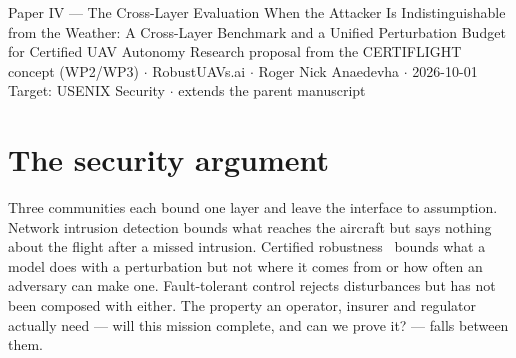 \documentclass[11pt,a4paper]{article}
\newcommand{\dnet}{\delta_{\mathrm{net}}}
\newcommand{\dfault}{\delta_{\mathrm{fault}}}
\newcommand{\denv}{\delta_{\mathrm{env}}}
\newcommand{\dgnss}{\delta_{\mathrm{gnss}}}
\newcommand{\dtot}{\delta_{\mathrm{tot}}}
\begin{document}
\proposalheader
  {Paper IV --- The Cross-Layer Evaluation}
  {When the Attacker Is Indistinguishable from the Weather: A Cross-Layer
   Benchmark and a Unified Perturbation Budget for Certified UAV Autonomy}
  {Research proposal from the CERTIFLIGHT concept (WP2/WP3) $\cdot$ RobustUAVs.ai
   $\cdot$ Roger Nick Anaedevha $\cdot$ 2026-10-01\\
   Target: USENIX Security $\cdot$ extends the parent manuscript~\cite{parentpaper}}

\begin{abstract}
\noindent
A UAV's navigation stack cannot tell, from the signal alone, whether its position
error is caused by a jammer, a drifting inertial unit, or a gust. We take that
indistinguishability as a security principle rather than a nuisance. If a
certificate is to mean anything to an operator, it must bound the mission outcome
under \emph{whatever} produced the perturbation, because the attacker is free to
choose the component that the defence models least well. We develop a unified
perturbation budget $\dtot=\dnet(\theta)\oplus\dgnss\oplus\dfault\oplus\denv$ that
aggregates an adversarial residual (a function of a network detector's operating
point), GNSS denial, stochastic faults and bounded environmental forcing into one
certified floor on the mission-completion rate --- and we show the security
consequence the single-source view misses: an adversary who shapes its
interference to \emph{mimic} a fault or a gust evades a detector tuned to
malicious signatures while producing the same navigation degradation. The
evaluation substrate is the missing ingredient in this field: a reproducible
cross-layer benchmark whose unit of record is the pairing of a network or
environmental event with the navigation window it induces, each pairing carrying
an auditable provenance flag that states whether the coupling was measured on one
platform, derived from a physical model, or aligned in simulation. We quantify
what the union-bound aggregation costs in tightness, and name the conditions
under which a joint treatment recovers it.
\end{abstract}

\section{The security argument}
Three communities each bound one layer and leave the interface to assumption.
Network intrusion detection bounds what reaches the aircraft but says nothing
about the flight after a missed intrusion. Certified
robustness~\cite{cohen2019smoothing,gronwall1919} bounds what a model does with a
perturbation but not where it comes from or how often an adversary can make one.
Fault-tolerant control rejects disturbances but has not been composed with
either. The property an operator, insurer and regulator actually need --- will
this mission complete, and can we prove it? --- falls between them.
\end{document}
